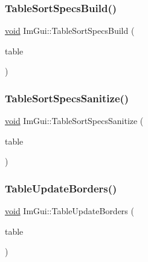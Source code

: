 \mbox{\label{namespaceImGui_a045bb5e3e5947c10260a4889b50e3e35}} 
\subsubsection{\texorpdfstring{Table\+Sort\+Specs\+Build()}{TableSortSpecsBuild()}}
{\footnotesize\ttfamily \hyperlink{imgui__impl__opengl3__loader_8h_ac668e7cffd9e2e9cfee428b9b2f34fa7}{void} Im\+Gui\+::\+Table\+Sort\+Specs\+Build (\begin{DoxyParamCaption}\item[{\hyperlink{structImGuiTable}{Im\+Gui\+Table} $\ast$}]{table }\end{DoxyParamCaption})}

\mbox{\label{namespaceImGui_a8c143be9781a6262c69019c7b6a03f22}} 
\subsubsection{\texorpdfstring{Table\+Sort\+Specs\+Sanitize()}{TableSortSpecsSanitize()}}
{\footnotesize\ttfamily \hyperlink{imgui__impl__opengl3__loader_8h_ac668e7cffd9e2e9cfee428b9b2f34fa7}{void} Im\+Gui\+::\+Table\+Sort\+Specs\+Sanitize (\begin{DoxyParamCaption}\item[{\hyperlink{structImGuiTable}{Im\+Gui\+Table} $\ast$}]{table }\end{DoxyParamCaption})}

\mbox{\label{namespaceImGui_a339483446800bd4c7d2e4f5683e21de0}} 
\subsubsection{\texorpdfstring{Table\+Update\+Borders()}{TableUpdateBorders()}}
{\footnotesize\ttfamily \hyperlink{imgui__impl__opengl3__loader_8h_ac668e7cffd9e2e9cfee428b9b2f34fa7}{void} Im\+Gui\+::\+Table\+Update\+Borders (\begin{DoxyParamCaption}\item[{\hyperlink{structImGuiTable}{Im\+Gui\+Table} $\ast$}]{table }\end{DoxyParamCaption})}

